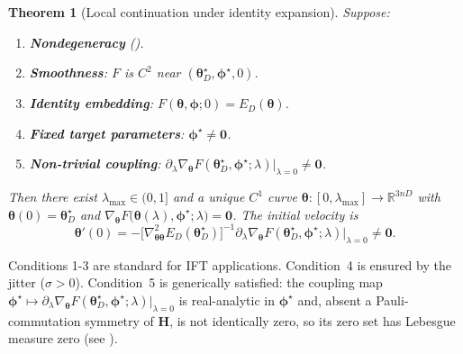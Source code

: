 \documentclass[11pt]{article}
\newcommand{\bbR}{\mathbb{R}}
\newtheorem{theorem}{Theorem}[section]
\theoremstyle{plain}
\theoremstyle{plain}
\begin{document}
\begin{theorem}[Local continuation under identity expansion]
\label{thm:continuation}
  Suppose:
  \begin{enumerate}[nosep]
    \item \textbf{Nondegeneracy} ().
    \item \textbf{Smoothness}: $F$ is $C^2$ near
      $(\bm\theta_D^\star,\bm\phi^\star,0)$.
    \item \textbf{Identity embedding}: $F(\bm\theta,\bm\phi;0)=E_D(\bm\theta)$.
    \item \textbf{Fixed target parameters}: $\bm\phi^\star\neq\bm 0$.
    \item \textbf{Non-trivial coupling}:
      $\partial_\lambda\nabla_{\bm\theta}
      F(\bm\theta_D^\star,\bm\phi^\star;\lambda)
      \big|_{\lambda=0}\neq\bm 0$.
  \end{enumerate}
  Then there exist $\lambda_{\max}\in(0,1]$ and a unique $C^1$ curve
  $\bm\theta:[0,\lambda_{\max}]\to\bbR^{3nD}$ with
  $\bm\theta(0)=\bm\theta_D^\star$ and
  $\nabla_{\bm\theta}
  F\bigl(\bm\theta(\lambda),\bm\phi^\star;\lambda\bigr)=\bm 0$.
  The initial velocity is
  \begin{equation}\label{eq:curve_deriv}
    \bm\theta'(0)
    =-\bigl[\nabla^2_{\bm\theta\bm\theta}
      E_D(\bm\theta_D^\star)\bigr]^{-1} 
     \partial_\lambda\nabla_{\bm\theta}
     F(\bm\theta_D^\star,\bm\phi^\star;\lambda)
     \big|_{\lambda=0}
    \neq\bm 0.
  \end{equation}
\end{theorem}
Conditions 1-3 are standard for IFT applications.
Condition~4 is ensured by the jitter ($\sigma>0$).
Condition~5 is generically satisfied: the coupling map
$\bm\phi^\star\mapsto\partial_\lambda\nabla_{\bm\theta}
F(\bm\theta_D^\star,\bm\phi^\star;\lambda)\big|_{\lambda=0}$ is real-analytic
in $\bm\phi^\star$ and, absent a Pauli-commutation symmetry of $\mathbf{H}$, is
not identically zero, so its zero set has Lebesgue measure zero (see
).
\end{document}

